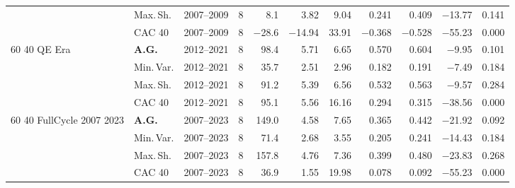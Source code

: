 \begin{longtable}{p{2.6cm} l c c r r r r r r r}
 & Max.\,Sh. & 2007--2009 & 8 & 8.1 & 3.82 & 9.04 & 0.241 & 0.409 & $-$13.77 & 0.141 \\
 & CAC 40 & 2007--2009 & 8 & $-$28.6 & $-$14.94 & 33.91 & $-$0.368 & $-$0.528 & $-$55.23 & 0.000 \\
\midrule
60 40 QE Era & \textbf{A.G.} & 2012--2021 & 8 & 98.4 & 5.71 & 6.65 & 0.570 & 0.604 & $-$9.95 & 0.101 \\
 & Min.\,Var. & 2012--2021 & 8 & 35.7 & 2.51 & 2.96 & 0.182 & 0.191 & $-$7.49 & 0.184 \\
 & Max.\,Sh. & 2012--2021 & 8 & 91.2 & 5.39 & 6.56 & 0.532 & 0.563 & $-$9.57 & 0.284 \\
 & CAC 40 & 2012--2021 & 8 & 95.1 & 5.56 & 16.16 & 0.294 & 0.315 & $-$38.56 & 0.000 \\
\midrule
60 40 FullCycle 2007 2023 & \textbf{A.G.} & 2007--2023 & 8 & 149.0 & 4.58 & 7.65 & 0.365 & 0.442 & $-$21.92 & 0.092 \\
 & Min.\,Var. & 2007--2023 & 8 & 71.4 & 2.68 & 3.55 & 0.205 & 0.241 & $-$14.43 & 0.184 \\
 & Max.\,Sh. & 2007--2023 & 8 & 157.8 & 4.76 & 7.36 & 0.399 & 0.480 & $-$23.83 & 0.268 \\
 & CAC 40 & 2007--2023 & 8 & 36.9 & 1.55 & 19.98 & 0.078 & 0.092 & $-$55.23 & 0.000 \\
\end{longtable}
\endgroup
